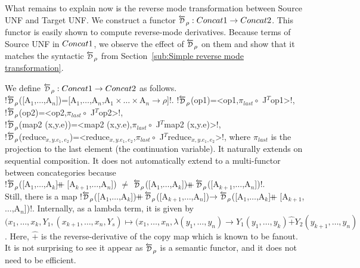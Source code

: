 What remains to explain now is the reverse mode transformation between Source UNF and Target UNF.
We construct a functor $\Dsynrevsymbol_{\rho}:\ConcatS\to\ConcatT$. 
This functor is easily shown to compute reverse-mode derivatives.
Because terms of Source UNF in $Concat1$, we observe the effect of $\Dsynrevsymbol_{\rho}$ on them
and show that it matches the syntactic $\Dsynrevsymbol_{\rho}$ 
from Section~\ref{sub:Simple reverse mode transformation}.

\begin{definition}
    We define $\Dsynrevsymbol_{\rho}:\ConcatS\to\ConcatT$ as follows.\\
    !$\Dsynrevsymbol_{\rho}$([A$_1$,$\ldots$,A$_n$])=[A$_1$,$\ldots$,A$_n$,A$_1\times\ldots\times$A$_n\to \rho$]!.
    !$\Dsynrevsymbol_{\rho}$(op1)=<op1,$\pi_{last}\circ$ J$^T$op1>!,\\ 
    !$\Dsynrevsymbol_{\rho}$(op2)=<op2,$\pi_{last}\circ$ J$^T$op2>!,\\
    !$\Dsynrevsymbol_{\rho}$(map2 (x,y.e))=<map2 (x,y.e),$\pi_{last}\circ$ J$^T$map2 (x,y.e)>!,\\
    !$\Dsynrevsymbol_{\rho}$(reduce$_{x,y.e_1,e_2}$)=<reduce$_{x,y.e_1,e_2}$,$\pi_{last}\circ$ J$^T$reduce$_{x,y.e_1,e_2}$>!, 
    where $\pi_{last}$ is the projection to the last element (the continuation variable).
    It naturally extends on sequential composition. 
    It does not automatically extend to a multi-functor between concategories because \\
    !$\Dsynrevsymbol_{\rho}$([A$_1$,$\ldots$,A$_k$]$\concatcomp$[A$_{k+1}$,$\ldots$,A$_n$]) $\neq$ $\Dsynrevsymbol_{\rho}$([A$_1$,$\ldots$,A$_k$])$\concatcomp\Dsynrevsymbol_{\rho}$([A$_{k+1}$,$\ldots$,A$_n$])!.\\
    Still, there is a map !$\Dsynrevsymbol_{\rho}$([A$_1$,$\ldots$,A$_k$])$\concatcomp \Dsynrevsymbol_{\rho}$([A$_{k+1}$,$\ldots$,A$_n$])$\to \Dsynrevsymbol_{\rho}$([A$_1$,$\ldots$,A$_k$]$\concatcomp$[A$_{k+1}$,$\ldots$,A$_n$])!.
    Internally, as a lambda term, it is given by \\
    $(x_1,\ldots,x_k,Y_1,(x_{k+1},\ldots,x_n,Y_s)\mapsto (x_1,\ldots,x_n,\lambda(y_1,\ldots,y_n)\to Y_1(y_1,\ldots,y_k)\widehat{+}Y_2(y_{k+1},\ldots,y_n)$.
    Here, $\widehat{+}$ is the reverse-derivative of the copy map which is known to be fanout. 
    It is not surprising to see it appear as $\Dsynrevsymbol_{\rho}$ is a semantic functor, and it does not need to be efficient. 
\end{definition}

